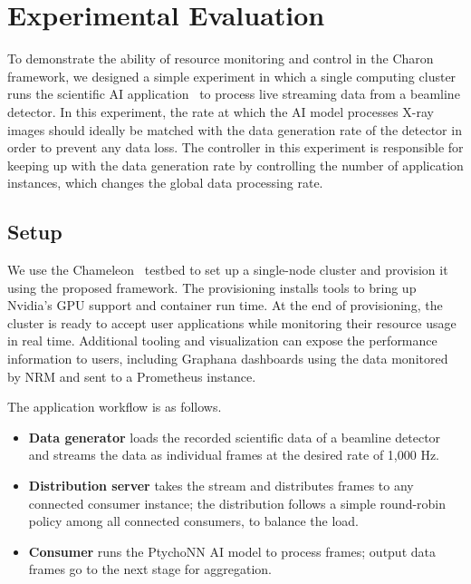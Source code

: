 \section{Experimental Evaluation}
\label{sec:result}

To demonstrate the ability of resource monitoring and control in the Charon framework, we designed a simple experiment in which a single computing cluster runs the scientific AI application~\cite{babu2022deep} to process live streaming data from a beamline detector. In this experiment, the rate at which the AI model processes X-ray images should ideally be matched with the data generation rate of the detector in order to prevent any data loss. The controller in this experiment is responsible for keeping up with the data generation rate by controlling the number of application instances, which changes the global data processing rate.

\subsection{Setup}

We use the Chameleon~\cite{chameleon} testbed to set up a single-node cluster and provision it using the proposed framework. The provisioning installs tools to bring up Nvidia's GPU support and container run time. At the end of provisioning, the cluster is ready to accept user applications while monitoring their resource usage in real time. Additional tooling and visualization can expose the performance information to users, including Graphana dashboards using the data monitored by NRM and sent to a Prometheus instance.

The application workflow is as follows.

\begin{itemize}
\item{\textbf{Data generator}} loads the recorded scientific data of a beamline detector and streams the data as individual frames at the desired rate of 1,000 Hz.
\item{\textbf{Distribution server}} takes the stream and distributes frames to any connected consumer instance; the distribution follows a simple round-robin policy among all connected consumers, to balance the load. 
\item{\textbf{Consumer} runs the PtychoNN AI model to process frames; output data frames go to the next stage for aggregation.}
\end{itemize}

